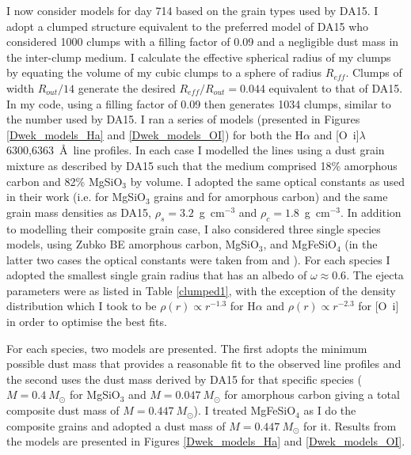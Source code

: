 I now consider models for day 714 based on the grain types
used by DA15.  I adopt a clumped structure equivalent to the 
preferred model of DA15 who considered 1000 clumps with a filling factor of 
0.09 and a negligible dust mass in the inter-clump medium.  I calculate 
the effective spherical radius of my clumps by equating the volume of my 
cubic clumps to a sphere of radius $R_{eff}$.  Clumps of width 
$R_{out}/14$ generate the desired $R_{eff}/R_{out}=0.044$ equivalent to 
that of DA15.  In my code, using a filling factor of 0.09 then generates 
1034 clumps, similar to the number used by DA15.  I ran a series of models 
(presented in Figures \ref{Dwek_models_Ha} and \ref{Dwek_models_OI}) for 
both the H$\alpha$ and [O~{\sc i}]$\lambda$6300,6363~\AA\ line profiles.  
In each case I modelled the lines using a dust grain mixture as described 
by DA15 such that the medium comprised 18\% amorphous carbon and 82\% 
MgSiO$_3$ by volume.  I adopted the same optical constants as used in 
their work (i.e. \citet{Jager2003} for MgSiO$_3$ grains and 
\citet{Zubko1996} for amorphous carbon) and the same grain mass densities as DA15, 
$\rho_s=3.2$~g~cm$^{-3}$ and $\rho_c=1.8$~g~cm$^{-3}$.  In addition to 
modelling their composite grain case, I also considered three single 
species models, using Zubko BE amorphous carbon, MgSiO$_3$, and 
MgFeSiO$_4$ (in the latter two cases the optical constants were taken from 
\citet{Jager1994} and \citet{Dorschner1995}). For each species I 
adopted the smallest single grain radius that has an albedo of $\omega 
\approx 0.6$. The ejecta 
parameters were as listed in Table \ref{clumped1}, with the exception of 
the density distribution which I took to be $\rho(r) \propto r^{-1.3}$ 
for H$\alpha$ and $\rho(r) \propto r^{-2.3}$ for [O~{\sc i}] in order to 
optimise the best fits.

For each species, two models are presented.  The first adopts the minimum 
possible dust mass that provides a reasonable fit to the observed line 
profiles and the second uses the dust mass derived by DA15 for that 
specific species ($M=0.4~M_{\odot}$ for MgSiO$_3$ and $M=0.047~M_{\odot}$ 
for amorphous carbon giving a total composite dust mass of 
$M=0.447~M_{\odot}$).  I treated MgFeSiO$_4$ as I do the composite 
grains and adopted a dust mass of $M=0.447~M_{\odot}$ for it.  Results 
from the models are presented in Figures \ref{Dwek_models_Ha} and 
\ref{Dwek_models_OI}.





